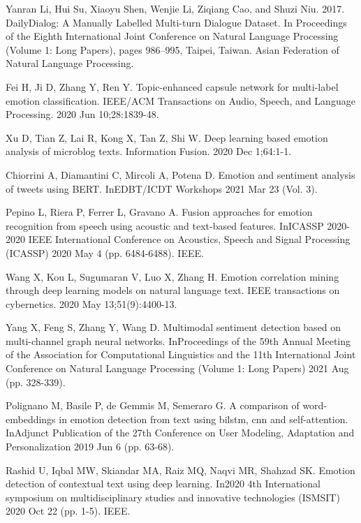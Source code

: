 \documentclass[runningheads]{llncs}
\begin{document}
\begin{thebibliography}{8}
Yanran Li, Hui Su, Xiaoyu Shen, Wenjie Li, Ziqiang Cao, and Shuzi Niu. 2017. DailyDialog: A Manually Labelled Multi-turn Dialogue Dataset. In Proceedings of the Eighth International Joint Conference on Natural Language Processing (Volume 1: Long Papers), pages 986–995, Taipei, Taiwan. Asian Federation of Natural Language Processing.

Fei H, Ji D, Zhang Y, Ren Y. Topic-enhanced capsule network for multi-label emotion classification. IEEE/ACM Transactions on Audio, Speech, and Language Processing. 2020 Jun 10;28:1839-48.

Xu D, Tian Z, Lai R, Kong X, Tan Z, Shi W. Deep learning based emotion analysis of microblog texts. Information Fusion. 2020 Dec 1;64:1-1.

Chiorrini A, Diamantini C, Mircoli A, Potena D. Emotion and sentiment analysis of tweets using BERT. InEDBT/ICDT Workshops 2021 Mar 23 (Vol. 3).

Pepino L, Riera P, Ferrer L, Gravano A. Fusion approaches for emotion recognition from speech using acoustic and text-based features. InICASSP 2020-2020 IEEE International Conference on Acoustics, Speech and Signal Processing (ICASSP) 2020 May 4 (pp. 6484-6488). IEEE.

Wang X, Kou L, Sugumaran V, Luo X, Zhang H. Emotion correlation mining through deep learning models on natural language text. IEEE transactions on cybernetics. 2020 May 13;51(9):4400-13.

Yang X, Feng S, Zhang Y, Wang D. Multimodal sentiment detection based on multi-channel graph neural networks. InProceedings of the 59th Annual Meeting of the Association for Computational Linguistics and the 11th International Joint Conference on Natural Language Processing (Volume 1: Long Papers) 2021 Aug (pp. 328-339).

Polignano M, Basile P, de Gemmis M, Semeraro G. A comparison of word-embeddings in emotion detection from text using bilstm, cnn and self-attention. InAdjunct Publication of the 27th Conference on User Modeling, Adaptation and Personalization 2019 Jun 6 (pp. 63-68). 

Rashid U, Iqbal MW, Skiandar MA, Raiz MQ, Naqvi MR, Shahzad SK. Emotion detection of contextual text using deep learning. In2020 4th International symposium on multidisciplinary studies and innovative technologies (ISMSIT) 2020 Oct 22 (pp. 1-5). IEEE.


\end{thebibliography}
\end{document}
